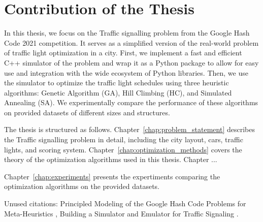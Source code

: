 \section*{Contribution of the Thesis}


In this thesis, we focus on the Traffic signalling problem from the Google Hash Code 2021 competition. It serves as a simplified version of the real-world problem of traffic light optimization in a city. First, we implement a fast and efficient C++ simulator of the problem and wrap it as a Python package to allow for easy use and integration with the wide ecosystem of Python libraries. Then, we use the simulator to optimize the traffic light schedules using three heuristic algorithms: Genetic Algorithm (GA), Hill Climbing (HC), and Simulated Annealing (SA). We experimentally compare the performance of these algorithms on provided datasets of different sizes and structures.

The thesis is structured as follows. Chapter~\ref{chap:problem_statement} describes the Traffic signalling problem in detail, including the city layout, cars, traffic lights, and scoring system. Chapter~\ref{chap:optimization_methods} covers the theory of the optimization algorithms used in this thesis. Chapter ...

Chapter~\ref{chap:experiments} presents the expertiments comparing the optimization algorithms on the provided datasets.

Unused citations: Principled Modeling of the Google Hash Code Problems for Meta-Heuristics \cite{rodrigues2023principled}, Building a Simulator and Emulator for Traffic Signaling \cite{li2022building}.
